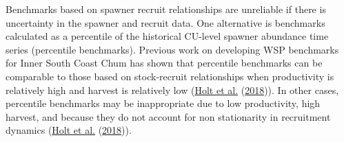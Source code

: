 \documentclass[11pt]{book}
\begin{document}
Benchmarks based on spawner recruit relationships are unreliable if there is uncertainty in the spawner and recruit data. One alternative is benchmarks calculated as a percentile of the historical CU-level spawner abundance time series (percentile benchmarks). Previous work on developing WSP benchmarks for Inner South Coast Chum has shown that percentile benchmarks can be comparable to those based on stock-recruit relationships when productivity is relatively high and harvest is relatively low (\protect\hyperlink{ref-holtEvaluatingBenchmarksBiological2018}{Holt et al.} (\protect\hyperlink{ref-holtEvaluatingBenchmarksBiological2018}{2018})). In other cases, percentile benchmarks may be inappropriate due to low productivity, high harvest, and because they do not account for non stationarity in recruitment dynamics (\protect\hyperlink{ref-holtEvaluatingBenchmarksBiological2018}{Holt et al.} (\protect\hyperlink{ref-holtEvaluatingBenchmarksBiological2018}{2018})).
\end{document}
